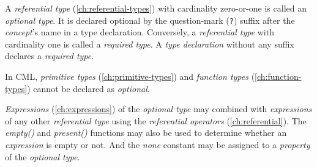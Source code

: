 A \emph{referential type} (\ref{ch:referential-types})
with cardinality zero-or-one is called an \emph{optional type}.
It is declared optional by the question-mark (\verb|?|) suffix
after the \emph{concept}'s name in a type declaration.
Conversely, a \emph{referential type} with cardinality one
is called a \emph{required type}.
A \emph{type declaration} without any suffix declares a \emph{required type}.

In CML, \emph{primitive types} (\ref{ch:primitive-types})
and \emph{function types} (\ref{ch:function-types})
cannot be declared as \emph{optional}.

\emph{Expressions} (\ref{ch:expressions})
of the \emph{optional type} may combined
with \emph{expressions} of any other \emph{referential type}
using the \emph{referential operators} (\ref{ch:referential}).
The \emph{empty()} and \emph{present()} functions may also be used
to determine whether an \emph{expression} is empty or not.
And the \emph{none} constant may be assigned to a \emph{property}
of the \emph{optional type}.
